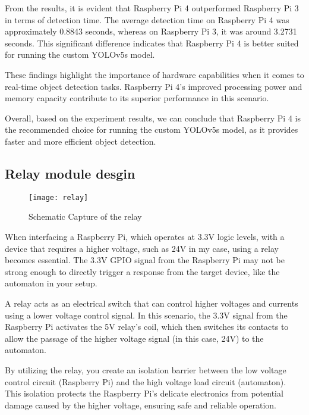 From the results, it is evident that Raspberry Pi 4 outperformed Raspberry Pi 3 in terms of detection time. The average detection time on Raspberry Pi 4 was approximately 0.8843 seconds, whereas on Raspberry Pi 3, it was around 3.2731 seconds. This significant difference indicates that Raspberry Pi 4 is better suited for running the custom YOLOv5s model.

These findings highlight the importance of hardware capabilities when it comes to real-time object detection tasks. Raspberry Pi 4's improved processing power and memory capacity contribute to its superior performance in this scenario.

Overall, based on the experiment results, we can conclude that Raspberry Pi 4 is the recommended choice for running the custom YOLOv5s model, as it provides faster and more efficient object detection.

\subsection{Relay module desgin}

\FloatBarrier
\begin{figure}[h]
\FloatBarrier
         \centering
        \texttt{[image: relay]}
   
        \caption{Schematic Capture of the relay}
        \label{Schematic Capture of the relay}
\FloatBarrier
    \end{figure}
\FloatBarrier
When interfacing a Raspberry Pi, which operates at 3.3V logic levels, with a device that requires a higher voltage, such as 24V in my case, using a relay becomes essential. The 3.3V GPIO signal from the Raspberry Pi may not be strong enough to directly trigger a response from the target device, like the automaton in your setup.

A relay acts as an electrical switch that can control higher voltages and currents using a lower voltage control signal. In this scenario, the 3.3V signal from the Raspberry Pi activates the 5V relay's coil, which then switches its contacts to allow the passage of the higher voltage signal (in this case, 24V) to the automaton.

By utilizing the relay, you create an isolation barrier between the low voltage control circuit (Raspberry Pi) and the high voltage load circuit (automaton). This isolation protects the Raspberry Pi's delicate electronics from potential damage caused by the higher voltage, ensuring safe and reliable operation.


